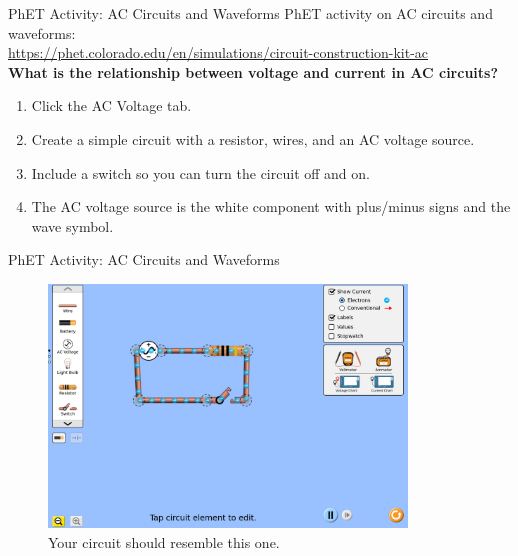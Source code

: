 \documentclass{beamer}
\begin{document}
\begin{frame}{PhET Activity: AC Circuits and Waveforms}
PhET activity on AC circuits and waveforms: \\ \vspace{0.5cm}
\url{https://phet.colorado.edu/en/simulations/circuit-construction-kit-ac} \\ \vspace{0.5cm}
\textbf{What is the relationship between voltage and current in AC circuits?}
\begin{enumerate}
\item Click the AC Voltage tab.
\item Create a simple circuit with a resistor, wires, and an AC voltage source.
\item Include a switch so you can turn the circuit off and on.
\item The AC voltage source is the white component with plus/minus signs and the wave symbol.
\end{enumerate}
\end{frame}

\begin{frame}{PhET Activity: AC Circuits and Waveforms}
\begin{figure}
\centering
\includegraphics[width=0.85\textwidth]{figures/PhET_AC_1.png}
\caption{\label{fig:phet_ac_1} Your circuit should resemble this one.}
\end{figure}
\end{frame}
\end{document}
